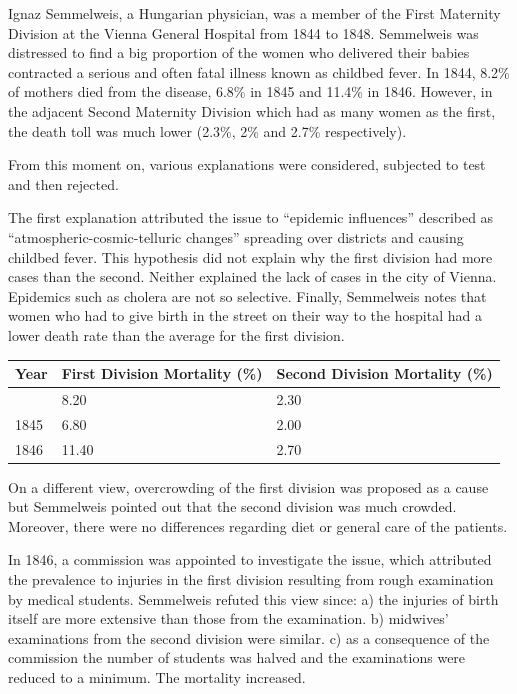 \documentclass[
  12pt,
]{book}
\begin{document}
Ignaz Semmelweis, a Hungarian physician, was a member of the First Maternity Division at the Vienna General Hospital from 1844 to 1848. Semmelweis was distressed to find a big proportion of the women who delivered their babies contracted a serious and often fatal illness known as childbed fever. In 1844, 8.2\% of mothers died from the disease, 6.8\% in 1845 and 11.4\% in 1846. However, in the adjacent Second Maternity Division which had as many women as the first, the death toll was much lower (2.3\%, 2\% and 2.7\% respectively).

From this moment on, various explanations were considered, subjected to test and then rejected.

The first explanation attributed the issue to ``epidemic influences'' described as ``atmospheric-cosmic-telluric changes'' spreading over districts and causing childbed fever. This hypothesis did not explain why the first division had more cases than the second. Neither explained the lack of cases in the city of Vienna. Epidemics such as cholera are not so selective. Finally, Semmelweis notes that women who had to give birth in the street on their way to the hospital had a lower death rate than the average for the first division.

\begin{longtable}[]{@{}lll@{}}
\toprule\noalign{}
Year & First Division Mortality (\%) & Second Division Mortality (\%) \\
\midrule\noalign{}
\endhead
\bottomrule\noalign{}
\endlastfoot
1844 & 8.20 & 2.30 \\
1845 & 6.80 & 2.00 \\
1846 & 11.40 & 2.70 \\
\end{longtable}

On a different view, overcrowding of the first division was proposed as a cause but Semmelweis pointed out that the second division was much crowded. Moreover, there were no differences regarding diet or general care of the patients.

In 1846, a commission was appointed to investigate the issue, which attributed the prevalence to injuries in the first division resulting from rough examination by medical students. Semmelweis refuted this view since: a) the injuries of birth itself are more extensive than those from the examination. b) midwives' examinations from the second division were similar. c) as a consequence of the commission the number of students was halved and the examinations were reduced to a minimum. The mortality increased.
\end{document}
